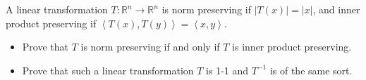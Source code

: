 \documentclass[12pt]{article}
\newenvironment{problem}[2][Problem]{\begin{trivlist}
\item[\hskip \labelsep {\bfseries #1}\hskip \labelsep {\bfseries #2.}]}{\end{trivlist}}
\begin{document}
\begin{problem}{1.7}
A linear transformation $T: \mathbb{R}^n \rightarrow \mathbb{R}^n$ is norm preserving if $\left| T\left(x\right) \right| = \left| x \right|$, and inner product preserving if $\left\langle T\left(x\right), T\left(y\right) \right\rangle = \left\langle x,y\right\rangle$.
\begin{itemize}
	\item Prove that $T$ is norm preserving if and only if $T$ is inner product preserving. \\
	\item Prove that such a linear transformation $T$ is 1-1 and $T^{-1}$ is of the same sort.\\
\end{itemize}
\end{problem}
\end{document}
